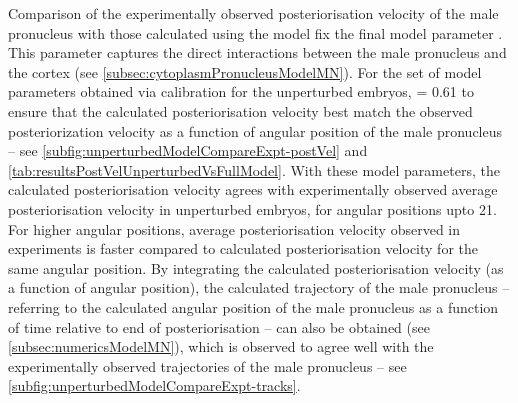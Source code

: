 Comparison of the experimentally observed posteriorisation velocity of the male pronucleus with those calculated using the model fix the final model parameter \dragCoefficient. This parameter captures the direct interactions between the male pronucleus and the cortex (see \autoref{subsec:cytoplasmPronucleusModelMN}). For the set of model parameters obtained via calibration for the unperturbed embryos, \dragCoefficient = \num{0.61} to ensure that the calculated posteriorisation velocity best match the observed posteriorization velocity as a function of angular position of the male pronucleus -- see \autoref{subfig:unperturbedModelCompareExpt-postVel} and \autoref{tab:resultsPostVelUnperturbedVsFullModel}. With these model parameters, the calculated posteriorisation velocity agrees with experimentally observed average posteriorisation velocity in unperturbed embryos, for angular positions upto \SI{21}{\unitAngle}. For higher angular positions, average posteriorisation velocity observed in experiments is faster compared to calculated posteriorisation velocity for the same angular position. By integrating the calculated posteriorisation velocity (as a function of angular position), the calculated trajectory of the male pronucleus -- referring to the calculated angular position of the male pronucleus as a function of time relative to end of posteriorisation -- can also be obtained (see \autoref{subsec:numericsModelMN}), which is observed to agree well with the experimentally observed trajectories of the male pronucleus -- see \autoref{subfig:unperturbedModelCompareExpt-tracks}.

